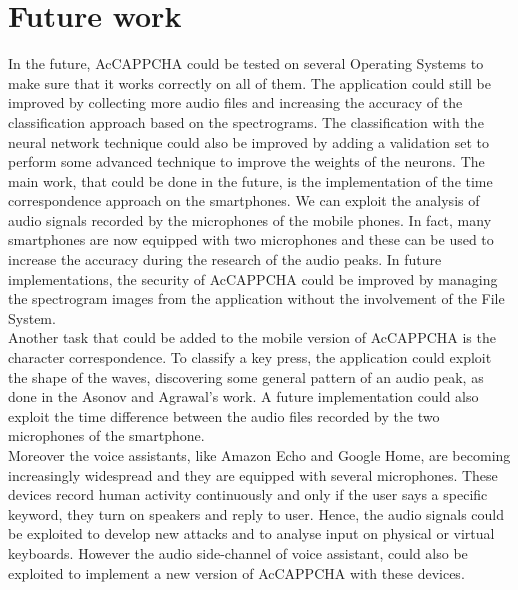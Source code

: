 \chapter{Future work}\label{chapter:Future}
In the future, AcCAPPCHA could be tested on several Operating Systems to make sure that it works correctly on all of them. The application could still be improved by collecting more audio files and increasing the accuracy of the classification approach based on the spectrograms. The classification with the neural network technique could also be improved by adding a validation set to perform some advanced technique to improve the weights of the neurons. The main work, that could be done in the future, is the implementation of the time correspondence approach on the smartphones. We can exploit the analysis of audio signals recorded by the microphones of the mobile phones. In fact, many smartphones are now equipped with two microphones and these can be used to increase the accuracy during the research of the audio peaks. In future implementations, the security of AcCAPPCHA could be improved by managing the spectrogram images from the application without the involvement of the File System.\\
Another task that could be added to the mobile version of AcCAPPCHA is the character correspondence. To classify a key press, the application could exploit the shape of the waves, discovering some general pattern of an audio peak, as done in the Asonov and Agrawal's work\cite{keyboard_acoustic}. A future implementation could also exploit the time difference between the audio files recorded by the two microphones of the smartphone\cite{smartphone_acoustic}.\\
Moreover the voice assistants, like Amazon Echo and Google Home, are becoming increasingly widespread and they are equipped with several microphones. These devices record human activity continuously and only if the user says a specific keyword, they turn on speakers and reply to user. Hence, the audio signals could be exploited to develop new attacks and to analyse input on physical or virtual keyboards\cite{voice_assistant}. However the audio side-channel of voice assistant, could also be exploited to implement a new version of AcCAPPCHA with these devices.\\